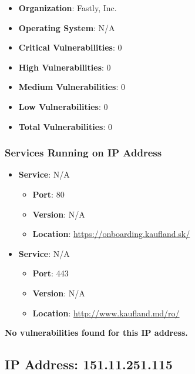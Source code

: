 \documentclass{article}
\begin{document}
\begin{itemize}
    \item \textbf{Organization}: Fastly, Inc.
    \item \textbf{Operating System}:  N/A 
    \item \textbf{Critical Vulnerabilities}: 0
    \item \textbf{High Vulnerabilities}: 0
    \item \textbf{Medium Vulnerabilities}: 0
    \item \textbf{Low Vulnerabilities}: 0
    \item \textbf{Total Vulnerabilities}: 0
\end{itemize}

\subsubsection*{Services Running on IP Address}

\begin{itemize}
    
        \item \textbf{Service}: N/A
        \begin{itemize}
            \item \textbf{Port}: 80
            \item \textbf{Version}:  N/A 
            \item \textbf{Location}: \href{ https://onboarding.kaufland.sk/ }{ https://onboarding.kaufland.sk/ }
        \end{itemize}
    
        \item \textbf{Service}: N/A
        \begin{itemize}
            \item \textbf{Port}: 443
            \item \textbf{Version}:  N/A 
            \item \textbf{Location}: \href{ http://www.kaufland.md/ro/ }{ http://www.kaufland.md/ro/ }
        \end{itemize}
    
\end{itemize}


\textbf{No vulnerabilities found for this IP address.}




\clearpage



\subsection{IP Address: 151.11.251.115}
\end{document}
